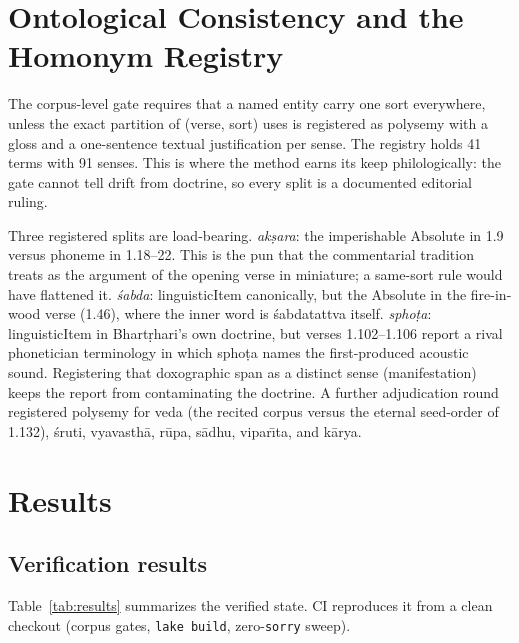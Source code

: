 \documentclass[11pt]{article}
\begin{document}
\section{Ontological Consistency and the Homonym Registry}
\label{sec:ontology}

The corpus-level gate requires that a named entity carry one sort everywhere,
unless the exact partition of (verse, sort) uses is registered as polysemy
with a gloss and a one-sentence textual justification per sense. The
registry holds 41 terms with 91 senses. This is where the method earns its
keep philologically: the gate cannot tell drift from doctrine, so every
split is a documented editorial ruling.

Three registered splits are load-bearing. \emph{ak\d{s}ara}: the
imperishable Absolute in 1.9 versus phoneme in 1.18--22. This is the pun
that the commentarial tradition treats as the argument of the opening verse
in miniature; a same-sort rule would have flattened it. \emph{\'sabda}:
linguisticItem canonically, but the Absolute in the fire-in-wood verse
(1.46), where the inner word is \'sabdatattva itself. \emph{spho\d{t}a}:
linguisticItem in Bhart\d{r}hari's own doctrine, but verses 1.102--1.106
report a rival phonetician terminology in which spho\d{t}a names the
first-produced acoustic sound. Registering that doxographic span as a
distinct sense (manifestation) keeps the report from contaminating the
doctrine. A further adjudication round registered polysemy for veda (the
recited corpus versus the eternal seed-order of 1.132), \'sruti,
vyavasth\={a}, r\={u}pa, s\={a}dhu, vipar\={\i}ta, and k\={a}rya.

\section{Results}
\label{sec:results}

\subsection{Verification results}
Table~\ref{tab:results} summarizes the verified state. CI reproduces it from
a clean checkout (corpus gates, \texttt{lake build}, zero-\texttt{sorry}
sweep).
\end{document}

